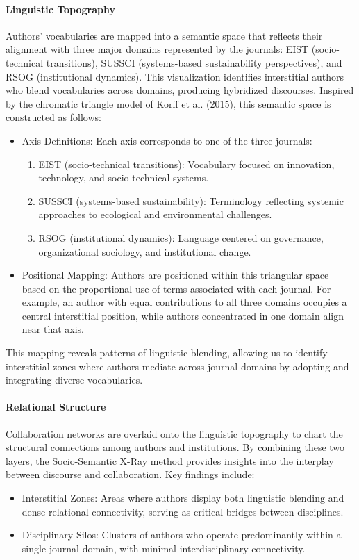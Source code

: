 \documentclass[12pt]{article}
\begin{document}
\paragraph{Linguistic Topography}
Authors' vocabularies are mapped into a semantic space that reflects their alignment with three major domains represented by the journals: EIST (socio-technical transitions), SUSSCI (systems-based sustainability perspectives), and RSOG (institutional dynamics). This visualization identifies interstitial authors who blend vocabularies across domains, producing hybridized discourses. Inspired by the chromatic triangle model of Korff et al. (2015), this semantic space is constructed as follows:
\begin{itemize}
    \item Axis Definitions: Each axis corresponds to one of the three journals:
    \begin{enumerate}
        \item EIST (socio-technical transitions): Vocabulary focused on innovation, technology, and socio-technical systems.
        \item SUSSCI (systems-based sustainability): Terminology reflecting systemic approaches to ecological and environmental challenges.
        \item RSOG (institutional dynamics): Language centered on governance, organizational sociology, and institutional change.
    \end{enumerate}
    \item Positional Mapping: Authors are positioned within this triangular space based on the proportional use of terms associated with each journal. For example, an author with equal contributions to all three domains occupies a central interstitial position, while authors concentrated in one domain align near that axis.
\end{itemize}

This mapping reveals patterns of linguistic blending, allowing us to identify interstitial zones where authors mediate across journal domains by adopting and integrating diverse vocabularies.

\paragraph{Relational Structure}
Collaboration networks are overlaid onto the linguistic topography to chart the structural connections among authors and institutions. By combining these two layers, the Socio-Semantic X-Ray method provides insights into the interplay between discourse and collaboration. Key findings include:
\begin{itemize}
    \item Interstitial Zones: Areas where authors display both linguistic blending and dense relational connectivity, serving as critical bridges between disciplines.
    \item Disciplinary Silos: Clusters of authors who operate predominantly within a single journal domain, with minimal interdisciplinary connectivity.
\end{itemize}
\end{document}
